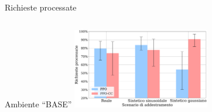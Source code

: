 \documentclass[]{beamer}
\begin{document}
\begin{frame}{Richieste processate}
    \begin{columns}
        \begin{column}{.5\textwidth}           
            \centering
            \small Ambiente ``BASE''
            \includegraphics[width=6cm]{assets/5/results/eval_BASE_summary_processed_requests.pdf}
        \end{column}
    \end{columns}

    \vspace{.3cm}


\end{frame}
\end{document}
